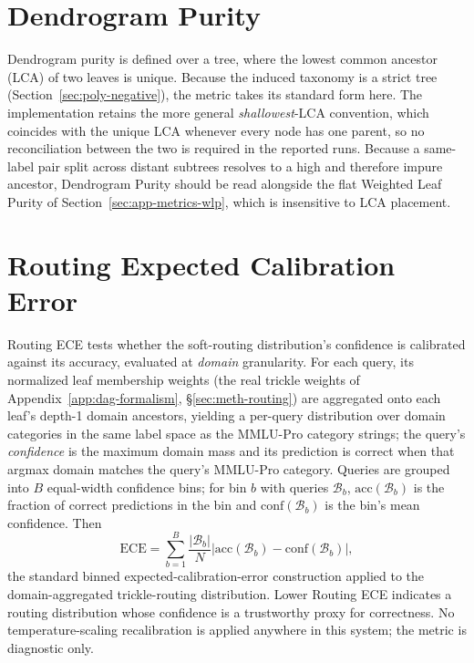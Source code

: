 \section{Dendrogram Purity}\label{sec:app-metrics-dendrogram-purity}

Dendrogram purity is defined over a tree, where the lowest
common ancestor (LCA) of two leaves is unique.
Because the induced taxonomy is a strict tree
(Section~\ref{sec:poly-negative}), the
metric takes its standard form here.
The implementation retains the more general \emph{shallowest}-LCA
convention, which coincides with the unique LCA whenever every node
has one parent, so no reconciliation between the two is required in
the reported runs.
Because a same-label pair split across distant subtrees resolves to a
high and therefore impure ancestor, Dendrogram
Purity should be read alongside the flat Weighted Leaf Purity of
Section~\ref{sec:app-metrics-wlp}, which is insensitive to LCA
placement.

\section{Routing Expected Calibration Error}\label{sec:app-metrics-ece}

Routing ECE tests whether the soft-routing distribution's confidence
is calibrated against its accuracy, evaluated at \emph{domain}
granularity. For each query, its normalized leaf membership weights
(the real trickle weights of Appendix~\ref{app:dag-formalism},
\S\ref{sec:meth-routing}) are aggregated onto each leaf's depth-1
domain ancestors, yielding a per-query distribution over domain
categories in the same label space as the MMLU-Pro category strings;
the query's \emph{confidence} is the maximum domain mass and its
prediction is correct when that argmax domain matches the query's
MMLU-Pro category. Queries are grouped
into $B$ equal-width confidence bins; for bin $b$ with queries
$\mathcal{B}_b$, $\text{acc}(\mathcal{B}_b)$ is the fraction of
correct predictions in the bin and $\text{conf}(\mathcal{B}_b)$ is
the bin's mean confidence. Then
\[
\text{ECE} = \sum_{b=1}^{B} \frac{|\mathcal{B}_b|}{N} \left| \text{acc}(\mathcal{B}_b) - \text{conf}(\mathcal{B}_b) \right|,
\]
the standard binned expected-calibration-error construction applied to
the domain-aggregated trickle-routing distribution. Lower Routing ECE
indicates a routing distribution whose confidence is a trustworthy
proxy for correctness. No temperature-scaling recalibration is applied
anywhere in this system; the metric is diagnostic only.

